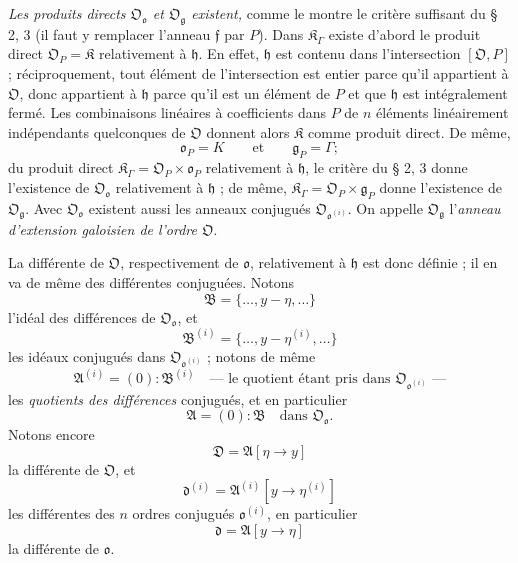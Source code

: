 \emph{Les produits directs $\mathfrak O_{\mathfrak o}$ et $\mathfrak O_{\mathfrak g}$ existent,} comme le montre le critère suffisant du \S{} 2, 3 (il faut y remplacer l'anneau $\mathfrak f$ par $P$). Dans $\mathfrak K_\Gamma$ existe d'abord le produit direct $\mathfrak O_P=\mathfrak K$ relativement à $\mathfrak h$. En effet, $\mathfrak h$ est contenu dans l'intersection $[\mathfrak O,P]$ ; réciproquement, tout élément de l'intersection est entier parce qu'il appartient à $\mathfrak O$, donc appartient à $\mathfrak h$ parce qu'il est un élément de $P$ et que $\mathfrak h$ est intégralement fermé. Les combinaisons linéaires à coefficients dans $P$ de $n$ éléments linéairement indépendants quelconques de $\mathfrak O$ donnent alors $\mathfrak K$ comme produit direct. De même,
\[
\mathfrak o_P=K
\qquad\text{et}\qquad
\mathfrak g_P=\Gamma;
\]
du produit direct $\mathfrak K_\Gamma=\mathfrak O_P\times\mathfrak o_P$ relativement à $\mathfrak h$, le critère du \S{} 2, 3 donne l'existence de $\mathfrak O_{\mathfrak o}$ relativement à $\mathfrak h$ ; de même, $\mathfrak K_\Gamma=\mathfrak O_P\times\mathfrak g_P$ donne l'existence de $\mathfrak O_{\mathfrak g}$. Avec $\mathfrak O_{\mathfrak o}$ existent aussi les anneaux conjugués $\mathfrak O_{\mathfrak o^{(i)}}$. On appelle $\mathfrak O_{\mathfrak g}$ l'\emph{anneau d'extension galoisien de l'ordre $\mathfrak O$}.

La différente de $\mathfrak O$, respectivement de $\mathfrak o$, relativement à $\mathfrak h$ est donc définie ; il en va de même des différentes conjuguées. Notons
\[
\mathfrak B=\{\ldots,y-\eta,\ldots\}
\]
l'idéal des différences de $\mathfrak O_{\mathfrak o}$, et
\[
\mathfrak B^{(i)}=\{\ldots,y-\eta^{(i)},\ldots\}
\]
les idéaux conjugués dans $\mathfrak O_{\mathfrak o^{(i)}}$ ; notons de même
\[
\mathfrak A^{(i)}=(0):\mathfrak B^{(i)}
\quad\text{--- le quotient étant pris dans $\mathfrak O_{\mathfrak o^{(i)}}$ ---}
\]
les \emph{quotients des différences} conjugués, et en particulier
\[
\mathfrak A=(0):\mathfrak B\quad\text{dans }\mathfrak O_{\mathfrak o}.
\]
Notons encore
\[
\mathfrak D=\mathfrak A[\eta\to y]
\]
la différente de $\mathfrak O$, et
\[
\mathfrak d^{(i)}=\mathfrak A^{(i)}[y\to\eta^{(i)}]
\]
les différentes des $n$ ordres conjugués $\mathfrak o^{(i)}$, en particulier
\[
\mathfrak d=\mathfrak A[y\to\eta]
\]
la différente de $\mathfrak o$.

